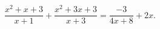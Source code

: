 \begin{ex}[type=equation]
	\begin{condition}
		$\dfrac{x^2 + x + 3}{x + 1} + \dfrac{x^2 + 3x + 3}{x + 3} = \dfrac{-3}{4x + 8} + 2x.$
	\end{condition}
\end{ex}